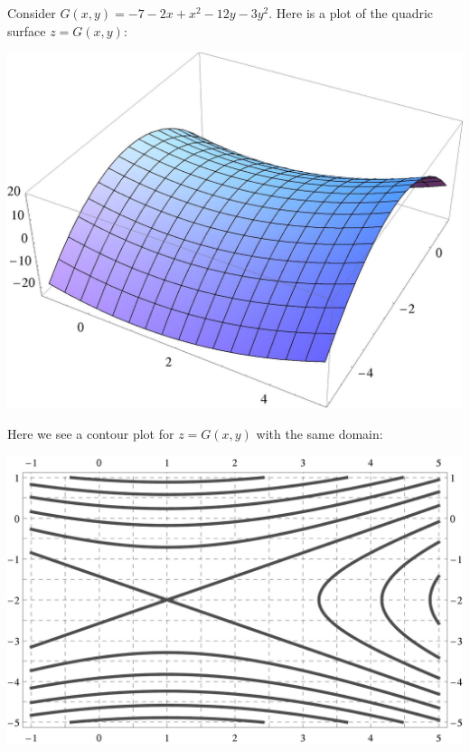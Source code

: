 \documentclass[handout,noauthor,nooutcomes]{ximera}
\begin{document}
\newpage


Consider $G(x,y)= -7 - 2 x + x^2 - 12 y - 3 y^2$. Here is a plot of
the quadric surface $z=G(x,y)$:
\begin{image}[3in]
  \includegraphics{surfacePlot2.jpg}
\end{image}
Here we see a contour plot for $z = G(x,y)$ with the same domain:
\begin{image}[4in]
  \includegraphics{contours2.jpg}
\end{image}

\newpage
\end{document}
